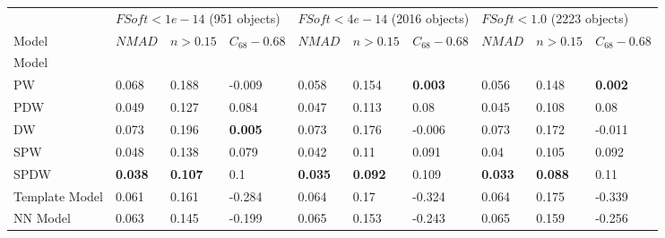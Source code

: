 \documentclass[fleqn,usenatbib]{mnras}
\begin{document}
\begin{table}
	\begin{tabular}{llllllllll}
            \hline
            {} & \multicolumn{3}{l}{$FSoft < 1e-14$ (951 objects)} & \multicolumn{3}{l}{$FSoft < 4e-14$ (2016 objects)} & \multicolumn{3}{l}{$FSoft < 1.0$ (2223 objects)} \\
            {Model} &                        $NMAD$ &        $n>0.15$ & $C_{68} - 0.68$ &                         $NMAD$ &        $n>0.15$ & $C_{68} - 0.68$ &                       $NMAD$ &        $n>0.15$ & $C_{68} - 0.68$ \\
            Model          &                               &                 &                 &                                &                 &                 &                              &                 &                 \\
            \hline
            PW             &                         0.068 &           0.188 &          -0.009 &                          0.058 &           0.154 &  \textbf{0.003} &                        0.056 &           0.148 &  \textbf{0.002} \\
            PDW            &                         0.049 &           0.127 &           0.084 &                          0.047 &           0.113 &            0.08 &                        0.045 &           0.108 &            0.08 \\
            DW             &                         0.073 &           0.196 &  \textbf{0.005} &                          0.073 &           0.176 &          -0.006 &                        0.073 &           0.172 &          -0.011 \\
            SPW            &                         0.048 &           0.138 &           0.079 &                          0.042 &            0.11 &            0.091 &                         0.04 &           0.105 &            0.092 \\
            SPDW           &                \textbf{0.038} &  \textbf{0.107} &             0.1 &                 \textbf{0.035} &  \textbf{0.092} &           0.109 &               \textbf{0.033} &  \textbf{0.088} &            0.11 \\
            Template Model &                         0.061 &           0.161 &          -0.284 &                          0.064 &            0.17 &          -0.324 &                        0.064 &           0.175 &          -0.339 \\
            NN Model       &                         0.063 &           0.145 &          -0.199 &                          0.065 &           0.153 &          -0.243 &                        0.065 &           0.159 &          -0.256 \\

\end{tabular}
\end{table}
\end{document}
